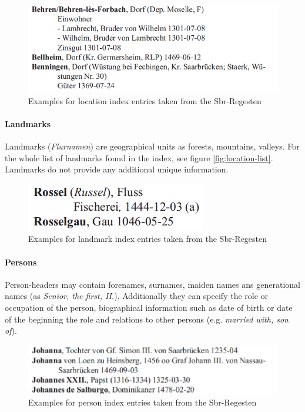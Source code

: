 \begin{figure}[h]
  \centering
  \includegraphics[scale=0.45]{img/location-example}
  \caption{Examples for location index entries taken from the Sbr-Regesten}
  \label{fig:location-example}
\end{figure}

\paragraph{Landmarks}
Landmarks (\textit{Flurnamen}) are geographical units as forests, mountains, valleys. For the whole list of landmarks found in the index, see figure \ref{fig:location-list}. Landmarks do not provide any additional unique information.%

\begin{figure}[h]
  \centering
  \includegraphics[scale=0.45]{img/landmark-example}
  \caption{Examples for landmark index entries taken from the Sbr-Regesten}
  \label{fig:landmark-example}
\end{figure}

\paragraph{Persons}
Person-headers may contain forenames, surnames, maiden names ans generational names (as \textit{Senior, the first, II.}). Additionally they can specify the role or occupation of the person, biographical information such as date of birth or date of the beginning the role and relations to other persons (e.g. \textit{married with, son of}).%
\begin{figure}[h]
  \centering
  \includegraphics[scale=0.45]{img/person-example}
  \caption{Examples for person index entries taken from the Sbr-Regesten}
  \label{fig:person-example}
\end{figure}

